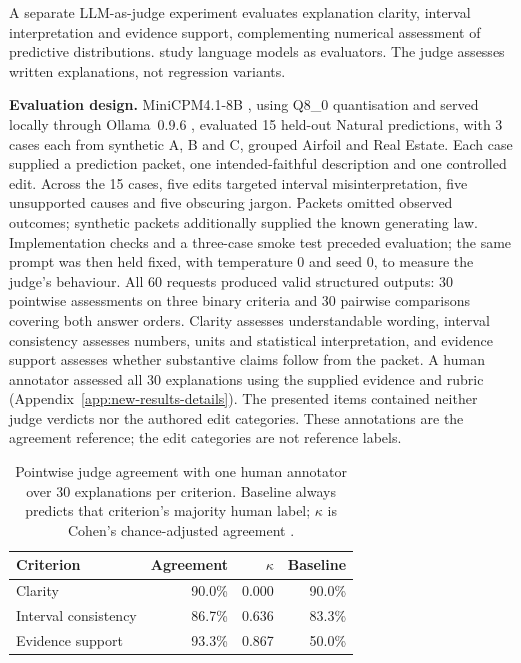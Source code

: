 A separate LLM-as-judge experiment evaluates explanation clarity, interval interpretation and evidence support, complementing numerical assessment of predictive distributions.
\citet{zheng2023judging} study language models as evaluators.
The judge assesses written explanations, not regression variants.

\textbf{Evaluation design.}
MiniCPM4.1-8B \cite{openbmb2025minicpm41}, using Q8\_0 quantisation and served locally through Ollama~0.9.6 \cite{ollama2025}, evaluated 15 held-out Natural predictions, with 3 cases each from synthetic A, B and C, grouped Airfoil and Real Estate.
Each case supplied a prediction packet, one intended-faithful description and one controlled edit.
Across the 15 cases, five edits targeted interval misinterpretation, five unsupported causes and five obscuring jargon.
Packets omitted observed outcomes; synthetic packets additionally supplied the known generating law.
Implementation checks and a three-case smoke test preceded evaluation; the same prompt was then held fixed, with temperature 0 and seed 0, to measure the judge's behaviour.
All 60 requests produced valid structured outputs: 30 pointwise assessments on three binary criteria and 30 pairwise comparisons covering both answer orders.
Clarity assesses understandable wording, interval consistency assesses numbers, units and statistical interpretation, and evidence support assesses whether substantive claims follow from the packet.
A human annotator assessed all 30 explanations using the supplied evidence and rubric (Appendix~\ref{app:new-results-details}).
The presented items contained neither judge verdicts nor the authored edit categories.
These annotations are the agreement reference; the edit categories are not reference labels.

\begin{table}[t]
\centering
\small
\setlength{\tabcolsep}{4pt}
\begin{tabular}{@{}lrrr@{}}
\toprule
Criterion & Agreement & $\kappa$ & Baseline \\
\midrule
Clarity & 90.0\% & 0.000 & 90.0\% \\
Interval consistency & 86.7\% & 0.636 & 83.3\% \\
Evidence support & 93.3\% & 0.867 & 50.0\% \\
\bottomrule
\end{tabular}
\caption{Pointwise judge agreement with one human annotator over 30 explanations per criterion.
Baseline always predicts that criterion's majority human label; $\kappa$ is Cohen's chance-adjusted agreement \cite{cohen1960agreement}.}
\label{tab:judge-human-results}
\end{table}

